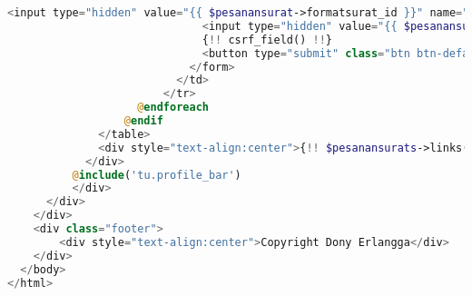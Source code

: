 \begin{lstlisting}[language=php,basicstyle=\tiny,caption=\textit{Home} TU]
                              <input type="hidden" value="{{ $pesanansurat->formatsurat_id }}" name="idFormatSurat">
                              <input type="hidden" value="{{ $pesanansurat->dataSurat }}" name="prosesSurat">
                              {!! csrf_field() !!}
                              <button type="submit" class="btn btn-default">Tambah<br>Nomor<br>Surat</button>
                            </form>
                          </td>
                        </tr>
                    @endforeach
                  @endif
              </table>
              <div style="text-align:center">{!! $pesanansurats->links() !!}</div>
            </div>
          @include('tu.profile_bar')
          </div>
      </div>
    </div>
    <div class="footer">
        <div style="text-align:center">Copyright Dony Erlangga</div>
    </div>
  </body>
</html>

\end{lstlisting}

